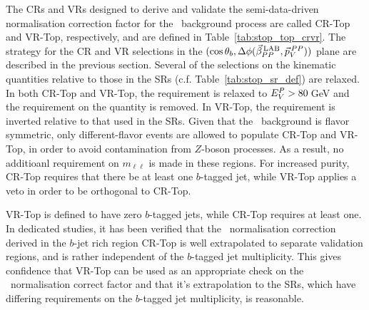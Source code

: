 The CRs and VRs designed to derive and validate the semi-data-driven
normalisation correction factor for the \ttbar~background process are called
CR-Top and VR-Top, respectively, and are defined in Table~\ref{tab:stop_top_crvr}.
The strategy for the CR and VR selections in the $(\cos\theta_b, \Delta \phi (\vec{\beta}_{PP}^{\,\text{LAB}}, \vec{p}_V^{\,PP}))$ plane are described
in the previous section.
Several of the selections on the kinematic quantities relative to those in the SRs (c.f. Table~\ref{tab:stop_sr_def})
are relaxed.
In both CR-Top and VR-Top, the \mdr requirement is relaxed to $E_V^P > 80$\,GeV and the requirement on the
\gaminv quantity is removed.
In VR-Top, the \rpt requirement is inverted relative to that used in the SRs.
Given that the \ttbar~background is flavor symmetric, only different-flavor events
are allowed to populate CR-Top and VR-Top, in order to avoid contamination from $Z$-boson processes.
As a result, no additioanl requirement on $m_{\ell\ell}$ is made in these regions.
For increased purity, CR-Top requires that there be at least one $b$-tagged jet,
while VR-Top applies a veto in order to be orthogonal to CR-Top.

VR-Top is defined to have zero $b$-tagged jets, while CR-Top requires at least one.
In dedicated studies, it has been verified that the \ttbar~normalisation correction derived
in the $b$-jet rich region CR-Top is well extrapolated to separate validation regions, and is rather
independent of the $b$-tagged jet multiplicity.
This gives confidence that VR-Top can be used as an appropriate check on the \ttbar~normalisation
correct factor and that it's extrapolation to the SRs, which have differing requirements on the
$b$-tagged jet multiplicity, is reasonable.

